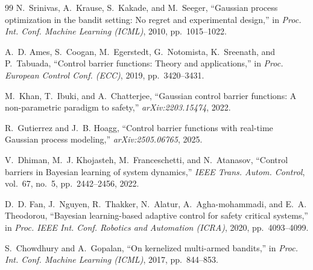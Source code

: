 \documentclass[letterpaper, 10 pt, conference]{ieeeconf}
\begin{document}
\begin{thebibliography}{99}
N.~Srinivas, A.~Krause, S.~Kakade, and M.~Seeger, ``Gaussian process optimization in the bandit setting: No regret and experimental design,'' in \emph{Proc. Int. Conf. Machine Learning (ICML)}, 2010, pp.~1015--1022.

A.~D. Ames, S.~Coogan, M.~Egerstedt, G.~Notomista, K.~Sreenath, and P.~Tabuada, ``Control barrier functions: Theory and applications,'' in \emph{Proc. European Control Conf. (ECC)}, 2019, pp.~3420--3431.

M.~Khan, T.~Ibuki, and A.~Chatterjee, ``Gaussian control barrier functions: A non-parametric paradigm to safety,'' \emph{arXiv:2203.15474}, 2022.

R.~Gutierrez and J.~B. Hoagg, ``Control barrier functions with real-time Gaussian process modeling,'' \emph{arXiv:2505.06765}, 2025.

V.~Dhiman, M.~J. Khojasteh, M.~Franceschetti, and N.~Atanasov, ``Control barriers in Bayesian learning of system dynamics,'' \emph{IEEE Trans. Autom. Control}, vol.~67, no.~5, pp.~2442--2456, 2022.

D.~D. Fan, J.~Nguyen, R.~Thakker, N.~Alatur, A.~Agha-mohammadi, and E.~A. Theodorou, ``Bayesian learning-based adaptive control for safety critical systems,'' in \emph{Proc. IEEE Int. Conf. Robotics and Automation (ICRA)}, 2020, pp.~4093--4099.

S.~Chowdhury and A.~Gopalan, ``On kernelized multi-armed bandits,'' in \emph{Proc. Int. Conf. Machine Learning (ICML)}, 2017, pp.~844--853.

\end{thebibliography}
\end{document}
